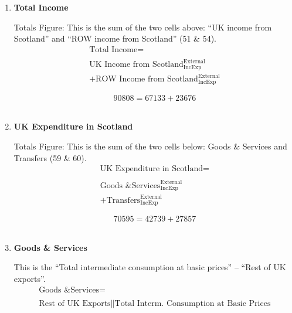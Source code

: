 \begin{enumerate}
\item \textbf {Total Income}

Totals Figure: This is the sum of the two cells above: ``UK income from Scotland'' and ``ROW income from Scotland'' (51 \& 54).\\

\begin{equation}
\begin{split}
\text{Total Income} =  \\ \\
\text{UK Income from Scotland}^\text{External}_\text{IncExp}\\
+\text{ROW Income from Scotland}^\text{External}_\text{IncExp}
\end{split} \label{eq:2.5.61}
\end{equation}

\begin{equation} \nonumber
90808 = 67133+23676
\end{equation}\\



\pagebreak

\item \textbf {UK Expenditure in Scotland}

Totals Figure: This is the sum of the two cells below: Goods \& Services and Transfers (59 \& 60).\\

\begin{equation}
\begin{split}
\text{UK Expenditure in Scotland} =  \\ \\
\text{Goods \& Services}^\text{External}_\text{IncExp}\\
+\text{Transfers}^\text{External}_\text{IncExp}
\end{split} \label{eq:2.5.62}
\end{equation}

\begin{equation} \nonumber
70595 = 42739+27857
\end{equation}\\


\item \textbf {Goods \& Services}

This is the ``Total intermediate consumption at basic prices'' – ``Rest of UK exports''. \cite{ScotGov2013a}\\

\begin{equation}
\begin{split}
\text{Goods \& Services} =  \\ \\
\text{Rest of UK Exports}\|\text{Total Interm. Consumption at Basic Prices}
\end{split} \label{eq:2.5.63}
\end{equation}


\end{enumerate}
